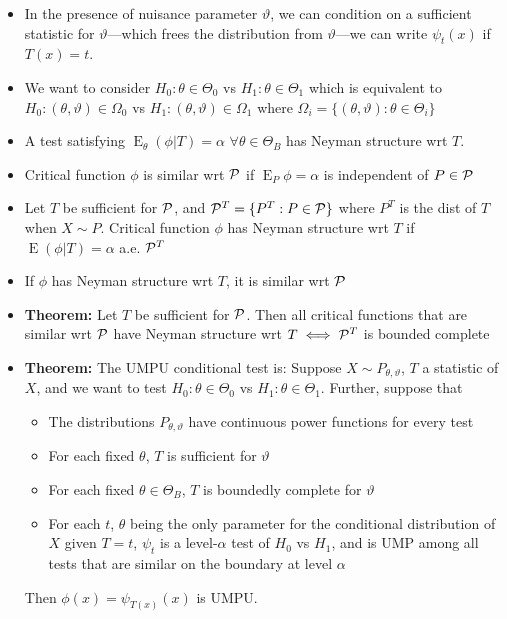 \documentclass[fontsize=5pt]{scrartcl}
\DeclareMathOperator{\E}{E}
\begin{document}
\begin{multicols}{2}
\begin{itemize}
\item In the presence of nuisance parameter $\vartheta$, we can condition on a
  sufficient statistic for $\vartheta$---which frees the distribution
  from $\vartheta$---we can write $\psi_{t}(x)$ if $T(x)=t$.

\item We want to consider $H_{0}:\theta\in\Theta_{0}$ vs
  $H_{1}:\theta\in\Theta_{1}$ which is equivalent to
  $H_{0}:(\theta,\vartheta)\in\Omega_{0}$ vs
  $H_{1}:(\theta,\vartheta)\in\Omega_{1}$ where
  $\Omega_{i}=\{(\theta,\vartheta):\theta\in\Theta_{i}\}$
\item A test satisfying $\E_{\theta}(\phi|T)=\alpha$
  $\forall\theta\in\Theta_{B}$ has Neyman structure wrt $T$.
\item Critical function $\phi$ is similar wrt ${\cal P}$ if
  $\E_{P}\phi = \alpha$ is independent of $P\in{\cal P}$
\item Let $T$ be sufficient for ${\cal P}$, and ${\cal
    P}^{T}=\{P^{T}:P\in{\cal P}\}$ where $P^{T}$ is the dist of $T$
  when $X\sim P$. Critical function $\phi$ has Neyman structure wrt
  $T$ if $\E(\phi|T)=\alpha$ a.e. ${\cal P}^{T}$
\item If $\phi$ has Neyman structure wrt $T$, it is similar wrt ${\cal P}$

\item \textbf{Theorem:} Let $T$ be sufficient for ${\cal P}$. Then all
  critical functions that are similar wrt ${\cal P}$ have Neyman
  structure wrt $T\iff{\cal P}^{T}$ is bounded complete
\item \textbf{Theorem:} The UMPU conditional test is: Suppose
  $X\sim P_{\theta,\vartheta}$, $T$ a statistic of $X$, and we want to
  test $H_{0}:\theta\in\Theta_{0}$ vs
  $H_{1}:\theta\in\Theta_{1}$. Further, suppose that
  \begin{itemize}
  \item The distributions $P_{\theta,\vartheta}$ have continuous power
    functions for every test
  \item For each fixed $\theta$, $T$ is sufficient for $\vartheta$
  \item For each fixed $\theta\in\Theta_{B}$, $T$ is boundedly
    complete for $\vartheta$
  \item For each $t$, $\theta$ being the only parameter for the
    conditional distribution of $X$ given $T=t$, $\psi_{t}$ is a
    level-$\alpha$ test of $H_{0}$ vs $H_{1}$, and is UMP among all
    tests that are similar on the boundary at level $\alpha$
  \end{itemize}
  Then $\phi(x) = \psi_{T(x)}(x)$ is UMPU.


\end{itemize}
\end{multicols}
\end{document}
